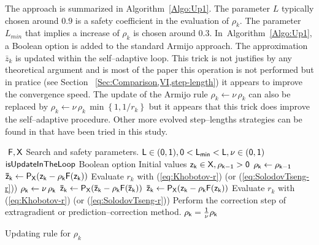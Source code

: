   The approach is summarized in Algorithm~\ref{Algo:Up1}. The parameter $L$ typically chosen around $0.9$ is a safety coefficient in the evaluation of $\rho_k$. The parameter $L_{min}$ that implies a increase of $\rho_k$ is chosen around $0.3$.
In~Algorithm~\ref{Algo:Up1}, a Boolean option is added to the standard Armijo approach. The approximation $\bar z_k$ is updated within the self--adaptive loop. This trick is not justifies by any theoretical argument and is most of the paper this operation is not performed but in pratice (see Section ~\ref{Sec:Comparison,VI,step-length}) it appears to improve the convergence speed.
 The update of the Armijo rule $\rho_k \leftarrow \nu \,\rho_k$ can also be replaced by  $\rho_k \leftarrow \nu \,\rho_k\, \min\left\{1, 1/r_k\right\}$ but it appears that this trick does improve the self--adaptive procedure. Other more evolved step--lengths strategies can be found in \citep{Wang_JCAM2010} that have been tried in this study.

\begin{algorithm}
  \begin{algorithmic}
    {\sf
      \STATE $ $
      \REQUIRE $\sf F,X$
      \REQUIRE Search and safety parameters. $\sf L \in (0,1), 0< L_{min} < L, \nu \in (0,1)$
      \REQUIRE $\sf isUpdateInTheLoop$ Boolean option
      \REQUIRE Initial values $\sf z_k \in X, \rho_{k-1} >0$
      \STATE $\sf \rho_k \leftarrow \rho_{k-1}$
      \STATE $\sf \bar z_{k} \leftarrow P_X(z_k-\rho_k F(z_k))$
      \STATE Evaluate $r_k$ with (\ref{eq:Khobotov-r}) (or (\ref{eq:SolodovTseng-r}))
      \STATE $\sf \rho_k \leftarrow \nu \,\rho_k$ 
      \STATE $\sf \bar z_{k} \leftarrow P_X(\bar z_k-\rho_k F(\bar z_k))$
      \ELSE
      \STATE $\sf \bar z_{k} \leftarrow P_X(z_k-\rho_k F(z_k))$
      \ENDIF
      \STATE Evaluate $r_k$ with (\ref{eq:Khobotov-r}) (or (\ref{eq:SolodovTseng-r}))
      \ENDWHILE
      \STATE Perform the correction step of extragradient or prediction--correction method.
      \STATE $\sf \rho_k = \frac 1 \nu \rho_k$ 
      \ENDIF
    }
  \end{algorithmic}
  \caption{Updating rule for $\rho_k$}  \label{Algo:Up1}
\end{algorithm}

